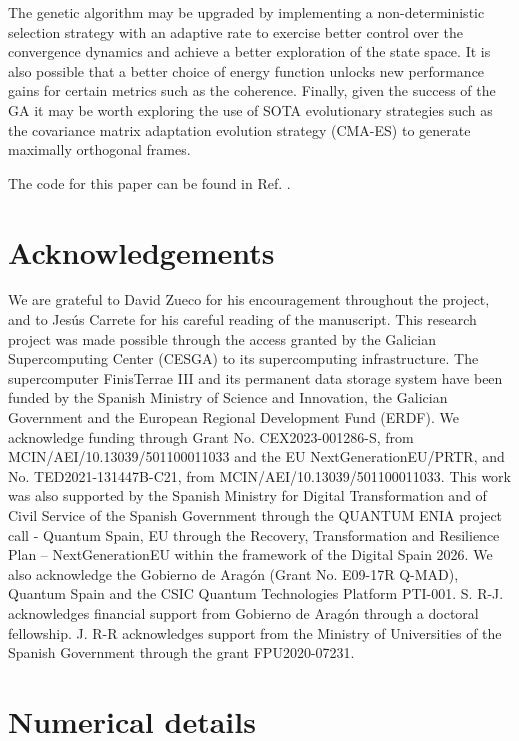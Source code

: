 \documentclass[%
superscriptaddress,
amsmath,amssymb,
 aps,
pra,
floatfix,
]{revtex4-2}
\begin{document}
The genetic algorithm may be upgraded by implementing a non-deterministic selection strategy with an adaptive rate to exercise better control over the convergence dynamics and achieve a better exploration of the state space. It is also possible that a better choice of energy function unlocks new performance gains for certain metrics such as the coherence. Finally, given the success of the GA it may be worth exploring the use of SOTA evolutionary strategies such as the covariance matrix adaptation evolution strategy (CMA-ES) to generate maximally orthogonal frames.

The code for this paper can be found in Ref. \cite{code}.

\section*{Acknowledgements}

We are grateful to David Zueco for his encouragement throughout the project, and to Jes\'us Carrete for his careful reading of the manuscript.
This research project was made possible through the access granted by the Galician Supercomputing Center (CESGA) to its supercomputing infrastructure. The supercomputer FinisTerrae III and its permanent data storage system have been funded by the Spanish Ministry of Science and Innovation, the Galician Government and the European Regional Development Fund (ERDF).
We acknowledge funding through Grant No. CEX2023-001286-S, from 
MCIN/AEI/10.13039/501100011033 and the EU NextGenerationEU/PRTR, and No. TED2021-131447B-C21,
from MCIN/AEI/10.13039/501100011033.  This work was also supported by the Spanish Ministry for Digital Transformation and of Civil Service of the Spanish Government through the QUANTUM ENIA project call - Quantum Spain, EU through the Recovery, Transformation and Resilience Plan – NextGenerationEU within the framework of the Digital Spain 2026.
We also acknowledge the Gobierno de Arag\'on (Grant No. E09-17R Q-MAD), Quantum Spain and the CSIC Quantum Technologies Platform PTI-001.
S. R-J.  acknowledges financial support from Gobierno de Arag\'on through a doctoral fellowship.
J. R-R acknowledges support from the Ministry of Universities of the Spanish Government through the grant FPU2020-07231.

\appendix

\section{Numerical details}
\label{app:numerics}
\end{document}
